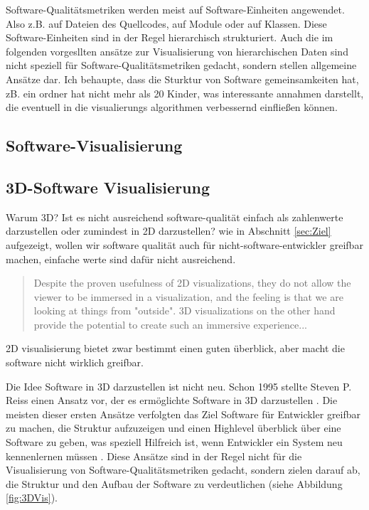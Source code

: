 Software-Qualitätsmetriken werden meist auf Software-Einheiten angewendet. Also z.B. auf Dateien des Quellcodes, auf Module oder auf Klassen. Diese Software-Einheiten sind in der Regel hierarchisch strukturiert. Auch die im folgenden vorgesllten ansätze zur Visualisierung von hierarchischen Daten sind nicht speziell für Software-Qualitätsmetriken gedacht, sondern stellen allgemeine Ansätze dar. Ich behaupte, dass die Sturktur von Software gemeinsamkeiten hat, zB. ein ordner hat nicht mehr als 20 Kinder, was interessante annahmen darstellt, die eventuell in die visualierungs algorithmen verbessernd einfließen können.  

\subsection{Software-Visualisierung} \label{sec:SoftwareVisualisierung} 



\subsection{3D-Software Visualisierung} \label{sec:3DSoftwareVisualisierung}   
Warum 3D? Ist es nicht ausreichend software-qualität einfach als zahlenwerte darzustellen oder zumindest in 2D darzustellen?
wie in Abschnitt \ref{sec:Ziel} aufgezeigt, wollen wir software qualität auch für nicht-software-entwickler greifbar machen, einfache werte sind dafür nicht ausreichend.
\begin{quote}
Despite the proven usefulness of 2D visualizations, they do not allow the viewer to be immersed in a visualization, and the feeling is that we are looking at things from "outside". 3D visualizations on the other hand provide the potential to create such an immersive experience... \cite[1]{codeCity1}
\end{quote}
2D visualisierung bietet zwar bestimmt einen guten überblick, aber macht die software nicht wirklich greifbar. 

Die Idee Software in 3D darzustellen ist nicht neu. Schon 1995 stellte Steven P. Reiss einen Ansatz vor, der es ermöglichte Software in 3D darzustellen \cite{first_3D_vis}. Die meisten dieser ersten Ansätze verfolgten das Ziel Software für Entwickler greifbar zu machen, die Struktur aufzuzeigen und einen Highlevel überblick über eine Software zu geben, was speziell Hilfreich ist, wenn Entwickler ein System neu kennenlernen müssen \cite{visSoftwareVR}.  Diese Ansätze sind in der Regel nicht für die Visualisierung von Software-Qualitätsmetriken gedacht, sondern zielen darauf ab, die Struktur und den Aufbau der Software zu verdeutlichen (siehe Abbildung \ref{fig:3DVis}).  

